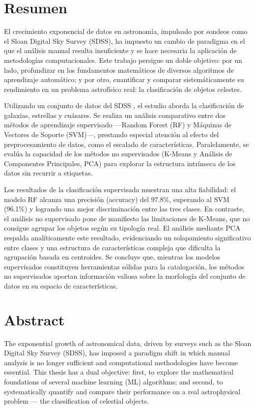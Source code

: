 \documentclass[12pt, a4paper]{report}
\begin{document}
\chapter*{Resumen}
El crecimiento exponencial de datos en astronomía, impulsado por sondeos como el Sloan Digital Sky Survey (SDSS), ha impuesto un cambio de paradigma en el que el análisis manual resulta insuficiente y se hace necesaria la aplicación de metodologías computacionales. Este trabajo persigue un doble objetivo: por un lado, profundizar en los fundamentos matemáticos de diversos algoritmos de aprendizaje automático; y por otro, cuantificar y comparar sistemáticamente su rendimiento en un problema astrofísico real: la clasificación de objetos celestes.

Utilizando un conjunto de datos del SDSS \citep{Abdurrouf2022}, el estudio aborda la clasificación de galaxias, estrellas y cuásares. Se realiza un análisis comparativo entre dos métodos de aprendizaje supervisado —Random Forest (RF) y Máquinas de Vectores de Soporte (SVM)—, prestando especial atención al efecto del preprocesamiento de datos, como el escalado de características. Paralelamente, se evalúa la capacidad de los métodos no supervisados (K-Means y Análisis de Componentes Principales, PCA) para explorar la estructura intrínseca de los datos sin recurrir a etiquetas.

Los resultados de la clasificación supervisada muestran una alta fiabilidad: el modelo RF alcanza una precisión (accuracy) del 97.8\%, superando al SVM (96.1\%) y logrando una mejor discriminación entre las tres clases. En contraste, el análisis no supervisado pone de manifiesto las limitaciones de K-Means, que no consigue agrupar los objetos según su tipología real. El análisis mediante PCA respalda analíticamente este resultado, evidenciando un solapamiento significativo entre clases y una estructura de características compleja que dificulta la agrupación basada en centroides. Se concluye que, mientras los modelos supervisados constituyen herramientas sólidas para la catalogación, los métodos no supervisados aportan información valiosa sobre la morfología del conjunto de datos en su espacio de características.

\vspace{1cm}

\chapter*{Abstract}
The exponential growth of astronomical data, driven by surveys such as the Sloan Digital Sky Survey (SDSS), has imposed a paradigm shift in which manual analysis is no longer sufficient and computational methodologies have become essential. This thesis has a dual objective: first, to explore the mathematical foundations of several machine learning (ML) algorithms; and second, to systematically quantify and compare their performance on a real astrophysical problem — the classification of celestial objects.
\end{document}
